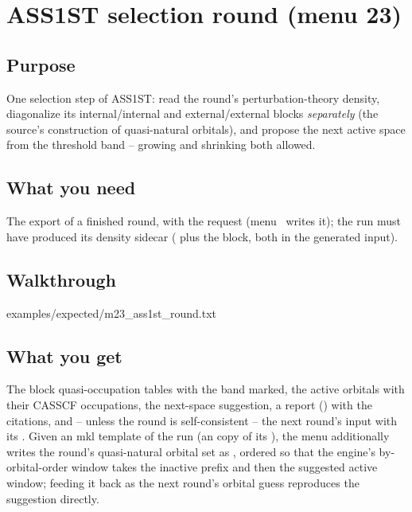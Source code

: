 \chapter{ASS1ST selection round (menu 23)}
\label{ch:menu23}

\section{Purpose}

One selection step of ASS1ST: read the round's perturbation-theory density,
diagonalize its internal/internal and external/external blocks \emph{separately}
(the source's construction of quasi-natural orbitals), and propose the next
active space from the threshold band -- growing and shrinking both allowed.

\section{What you need}

The  export of a finished round, with the request
(menu~ writes it); the run must have produced its density sidecar
( plus the  block, both in the generated
input).

\section{Walkthrough}


  {examples/expected/m23_ass1st_round.txt}

\section{What you get}

The block quasi-occupation tables with the band marked, the active orbitals
with their CASSCF occupations, the next-space suggestion, a report
() with the citations, and -- unless the round is
self-consistent -- the next round's input  with its
.  Given an mkl template of the run (an 
copy of its ), the menu additionally writes the round's
quasi-natural orbital set as , ordered so that the
engine's by-orbital-order window takes the inactive prefix and then the
suggested active window; feeding it back as the next round's orbital guess
reproduces the suggestion directly.

